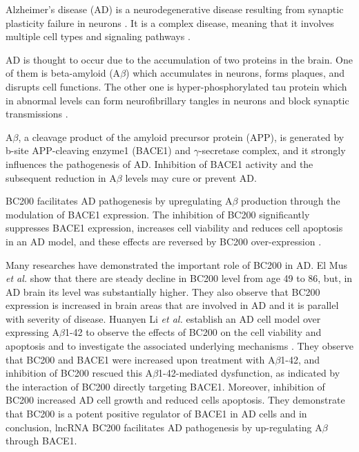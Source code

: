 \documentclass[conference, 11pt]{IEEEtran}
\begin{document}
Alzheimer's disease (AD) is a neurodegenerative disease resulting from synaptic plasticity failure in neurons \cite{mus2007dendritic}. 
It is a complex disease, meaning that it involves multiple cell types and signaling pathways \cite{zhang2021role}.

AD is thought to occur due to the accumulation of two proteins in the brain. 
One of them is beta-amyloid (A$\beta$) which accumulates in neurons, forms plaques, and disrupts cell functions. 
The other one is hyper-phosphorylated tau protein which in abnormal levels can form neurofibrillary tangles in neurons and block synaptic transmissions \cite{zhang2021role}.

A$\beta$, a cleavage product of the amyloid precursor protein (APP), is generated by b-site APP-cleaving enzyme1 (BACE1) and $\gamma$-secretase complex, and it strongly influences the pathogenesis of AD. 
Inhibition of BACE1 activity and the subsequent reduction in A$\beta$ levels may cure or prevent AD\cite{li2018identification,zhang2021role}.

BC200 facilitates AD pathogenesis by upregulating A$\beta$ production through the modulation of BACE1 expression. 
The inhibition of BC200 significantly suppresses BACE1 expression, increases cell viability and reduces cell apoptosis in an AD model, and these effects are reversed by BC200 over-expression \cite{li2018identification,zhang2021role}.

Many researches have demonstrated the important role of BC200 in AD. 
El Mus \emph{et al.} show that there are steady decline in BC200 level from age 49 to 86, but, in AD brain its level was substantially higher\cite{mus2007dendritic}. 
They also observe that BC200 expression is increased in brain areas that are involved in AD and it is parallel with severity of disease. 
Huanyen Li \emph{et al.} establish an AD cell model over expressing A$\beta$1-42 to observe the effects of BC200 on the cell viability and apoptosis and to investigate the associated underlying mechanisms\cite{li2018identification} . 
They observe that BC200 and BACE1 were increased upon treatment with A$\beta$1-42, and inhibition of BC200 rescued this A$\beta$1-42-mediated dysfunction, as indicated by the interaction of BC200 directly targeting BACE1. 
Moreover, inhibition of BC200 increased AD cell growth and reduced cells apoptosis. 
They demonstrate that BC200 is a potent positive regulator of BACE1 in AD cells and in conclusion, lncRNA BC200 facilitates AD pathogenesis by up-regulating A$\beta$ through BACE1.  					 			 		 	 
\end{document}

